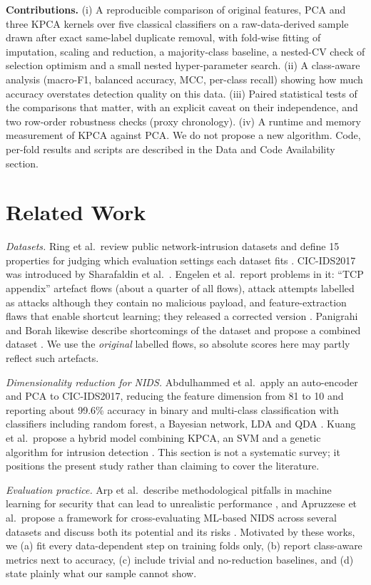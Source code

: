 \documentclass{ieeeaccess}
\begin{document}
\textbf{Contributions.} (i) A reproducible comparison of original features, PCA and three KPCA kernels over five classical classifiers on a raw-data-derived sample drawn after exact same-label duplicate removal, with fold-wise fitting of imputation, scaling and reduction, a majority-class baseline, a nested-CV check of selection optimism and a small nested hyper-parameter search. (ii) A class-aware analysis (macro-F1, balanced accuracy, MCC, per-class recall) showing how much accuracy overstates detection quality on this data. (iii) Paired statistical tests of the comparisons that matter, with an explicit caveat on their independence, and two row-order robustness checks (proxy chronology). (iv) A runtime and memory measurement of KPCA against PCA. We do not propose a new algorithm. Code, per-fold results and scripts are described in the Data and Code Availability section.

\section{Related Work}
\textit{Datasets.} Ring et al.\ review public network-intrusion datasets and define 15 properties for judging which evaluation settings each dataset fits \cite{ring2019}. CIC-IDS2017 was introduced by Sharafaldin et al.\ \cite{sharafaldin2018}. Engelen et al.\ report problems in it: ``TCP appendix'' artefact flows (about a quarter of all flows), attack attempts labelled as attacks although they contain no malicious payload, and feature-extraction flaws that enable shortcut learning; they released a corrected version \cite{engelen2021}. Panigrahi and Borah likewise describe shortcomings of the dataset and propose a combined dataset \cite{panigrahi2018}. We use the \emph{original} labelled flows, so absolute scores here may partly reflect such artefacts.

\textit{Dimensionality reduction for NIDS.} Abdulhammed et al.\ apply an auto-encoder and PCA to CIC-IDS2017, reducing the feature dimension from 81 to 10 and reporting about 99.6\% accuracy in binary and multi-class classification with classifiers including random forest, a Bayesian network, LDA and QDA \cite{abdulhammed2019}. Kuang et al.\ propose a hybrid model combining KPCA, an SVM and a genetic algorithm for intrusion detection \cite{kuang2014}. This section is not a systematic survey; it positions the present study rather than claiming to cover the literature.

\textit{Evaluation practice.} Arp et al.\ describe methodological pitfalls in machine learning for security that can lead to unrealistic performance \cite{arp2022}, and Apruzzese et al.\ propose a framework for cross-evaluating ML-based NIDS across several datasets and discuss both its potential and its risks \cite{apruzzese2022}. Motivated by these works, we (a) fit every data-dependent step on training folds only, (b) report class-aware metrics next to accuracy, (c) include trivial and no-reduction baselines, and (d) state plainly what our sample cannot show.
\end{document}
